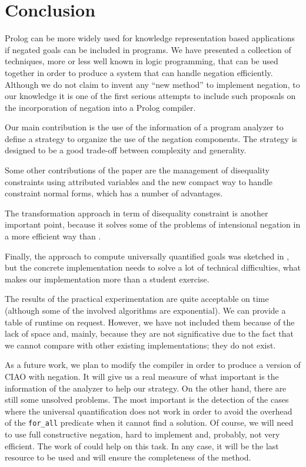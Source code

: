 \documentclass[]{llncs}
\begin{document}
\vspace{-7pt}
\section{Conclusion}
\vspace{-7pt}

Prolog can be more widely used for knowledge representation based applications
if negated goals can be included in programs.
We have presented a collection of techniques, more or less well
known in logic programming, that can be used together in order
to produce a system that can handle negation efficiently.
Although we do not claim to invent any ``new method'' to
implement negation, to our knowledge it is one of the first
serious attempts to include such proposals on the incorporation of
negation into a Prolog compiler.

Our main contribution is the use of the information of a program
analyzer to define a strategy to organize the use of the
negation components. The strategy is designed
to be a good trade-off between complexity and generality.

Some other contributions of the paper are the management of
disequality constraints using attributed variables and the new
compact way to handle constraint normal forms, which has a number of
advantages.

The transformation approach in term of disequality
constraint is another important point, because it solves some
of the problems of intensional negation \cite{Barbuti2} 
in a more efficient way than \cite{Bruscoli}.

Finally, the approach to compute universally quantified goals
was sketched in \cite{Barbuti2}, but the concrete implementation
needs to solve a lot of technical difficulties, what makes our
implementation more than a student exercise.

The results of the practical experimentation are quite acceptable
on time (although some of the involved algorithms are exponential). 
We can provide a table of runtime on request. 
However, we have not
included them because of the lack of space and, mainly, because
they are not significative due to the fact that we cannot compare with 
other existing implementations; they do not exist.

As a future work, we plan to modify the compiler in order to
produce a version of CIAO with negation. 
It will give us a
real measure of what important is the information of the
analyzer to help our strategy. On the other hand, there are
still some unsolved problems. The most important is the
detection of the cases where the universal quantification does
not work in order to avoid the overhead of the {\tt for\_all} 
predicate when it
cannot find a solution. Of course, we will need to use
full constructive negation, hard to implement and, probably, not
very efficient. The work of \cite{Drabent} could help on this task.
In any case, it will be the last resource to be used and will ensure the 
completeness of the method.




\begin{small}




\end{small}
\end{document}
